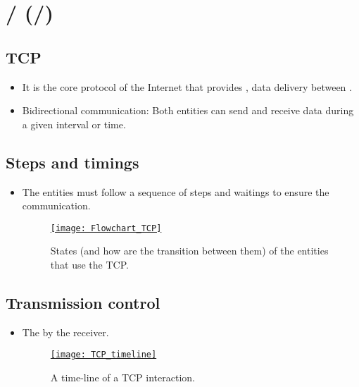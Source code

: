 \chapter{/ (/)}

\section{\gls{TCP}}
\begin{itemize}
\item It is the core protocol of the Internet that provides
  , data delivery between
  \cite{wikipedia_TCP}.
\item Bidirectional communication: Both entities can send and receive
  data during a given interval or time.
\end{itemize}

\section{Steps and timings}
\begin{itemize} 
\item The entities must follow a sequence of steps and waitings to ensure the communication.
\begin{figure}[H]
  \vspace{-0ex}
  \centering
  \href{https://www.ibm.com/support/pages/flowchart-tcp-connections-and-their-definition}{\texttt{[image: Flowchart\_TCP]}}
  \caption{States (and how are the transition between them) of the
    entities that use the \gls{TCP}.}
  \label{fig:TCP_states}
\end{figure}
\end{itemize}


\section{Transmission control}
\begin{itemize} 
\item The  by the receiver.
\begin{figure}[H]
  \vspace{-0ex}
  \centering
  \href{https://ieeexplore.ieee.org/document/8668433}{\texttt{[image: TCP\_timeline]}}
  \caption{A time-line of a \gls{TCP} interaction.}
  \label{fig:TCP_interaction}
\end{figure}
\end{itemize}

